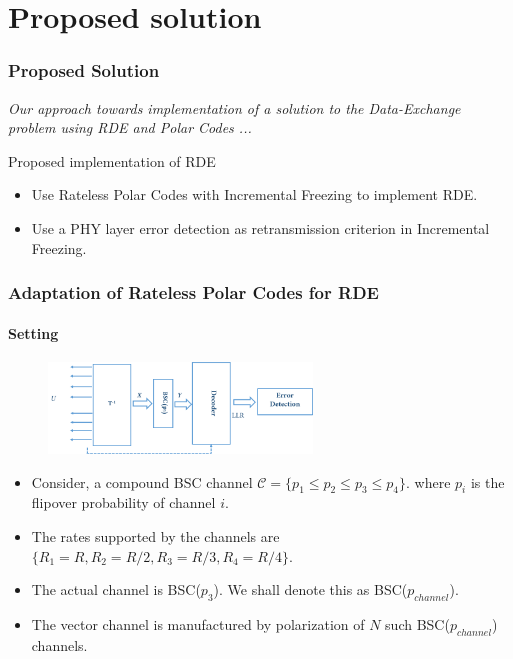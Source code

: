 \documentclass[xcolor=dvipsnames]{beamer}
\begin{document}
\section{Proposed solution}
\begin{frame}[label=propsol]
\frametitle{Proposed Solution}
\textit{Our approach towards implementation of a solution to the \emph{Data-Exchange} problem using RDE and Polar Codes ... }
\begin{block}{Proposed implementation of RDE}
\begin{itemize}
\item{Use Rateless Polar Codes with Incremental Freezing to implement RDE.}
\item{Use a PHY layer error detection as retransmission criterion in Incremental Freezing.}
\end{itemize}
\end{block}
\end{frame}
\begin{frame}[label=adapt0]
\frametitle{Adaptation of Rateless Polar Codes for RDE}
\framesubtitle{Setting}
\begin{figure}[h]
 \begin{center}
    \includegraphics[width=7cm]{setting.png}
  \end{center}
  \label{fig:iswrpc}
\end{figure} 
\begin{itemize}
\item Consider, a compound BSC channel $\mathcal{C}=\{ p_1 \leq p_2 \leq p_3 \leq p_4\}$. where $p_i$ is the flipover probability of channel $i$. 
\item The rates supported by the channels are $\{ R_1=R, R_2= R/2,R_3= R/3,R_4= R/4\}$.
\item The actual channel is BSC($p_3$). We shall denote this as BSC($p_{channel}$).
\item The vector channel is manufactured by polarization of $N$ such BSC($p_{channel}$) channels.
\end{itemize}
\end{frame}
\end{document}
